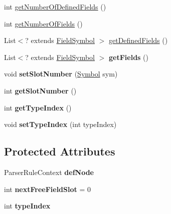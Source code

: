 \begin{DoxyCompactItemize}
\item 
int \hyperlink{classlime_1_1antlr4_1_1DataAggregateSymbol_a80cf20fc8ae60730946f7dc2f1ab4a41}{get\+Number\+Of\+Defined\+Fields} ()
\item 
int \hyperlink{classlime_1_1antlr4_1_1DataAggregateSymbol_a12600a8ff3a06f489aa27ee91c9217bd}{get\+Number\+Of\+Fields} ()
\item 
List$<$? extends \hyperlink{classlime_1_1antlr4_1_1FieldSymbol}{Field\+Symbol} $>$ \hyperlink{classlime_1_1antlr4_1_1DataAggregateSymbol_abbb99b03010fbdccae19b976e79c468a}{get\+Defined\+Fields} ()
\item 
\mbox{\label{classlime_1_1antlr4_1_1DataAggregateSymbol_a5b9ecf928da2dd6935702a045c6da293}} 
List$<$? extends \hyperlink{classlime_1_1antlr4_1_1FieldSymbol}{Field\+Symbol} $>$ {\bfseries get\+Fields} ()
\item 
\mbox{\label{classlime_1_1antlr4_1_1DataAggregateSymbol_ac83d1a71775a59209a623165aa1e21bf}} 
void {\bfseries set\+Slot\+Number} (\hyperlink{interfacelime_1_1antlr4_1_1Symbol}{Symbol} sym)
\item 
\mbox{\label{classlime_1_1antlr4_1_1DataAggregateSymbol_a6e3dc3797fa29f5cfcdfa4ddcf50c842}} 
int {\bfseries get\+Slot\+Number} ()
\item 
\mbox{\label{classlime_1_1antlr4_1_1DataAggregateSymbol_ae012c961e0e1dc6c1455166b52b815e6}} 
int {\bfseries get\+Type\+Index} ()
\item 
\mbox{\label{classlime_1_1antlr4_1_1DataAggregateSymbol_ae2a3a658f2bd92c4825c94069c2413b5}} 
void {\bfseries set\+Type\+Index} (int type\+Index)
\end{DoxyCompactItemize}
\subsection*{Protected Attributes}
\begin{DoxyCompactItemize}
\item 
\mbox{\label{classlime_1_1antlr4_1_1DataAggregateSymbol_a13f4406e50faf421894a1f392d6d0f09}} 
Parser\+Rule\+Context {\bfseries def\+Node}
\item 
\mbox{\label{classlime_1_1antlr4_1_1DataAggregateSymbol_a1a0641836e8fb11ac9c6be114f05cc34}} 
int {\bfseries next\+Free\+Field\+Slot} = 0
\item 
\mbox{\label{classlime_1_1antlr4_1_1DataAggregateSymbol_ae526e41519f171ae95e591ec7bf0ddf1}} 
int {\bfseries type\+Index}
\end{DoxyCompactItemize}


